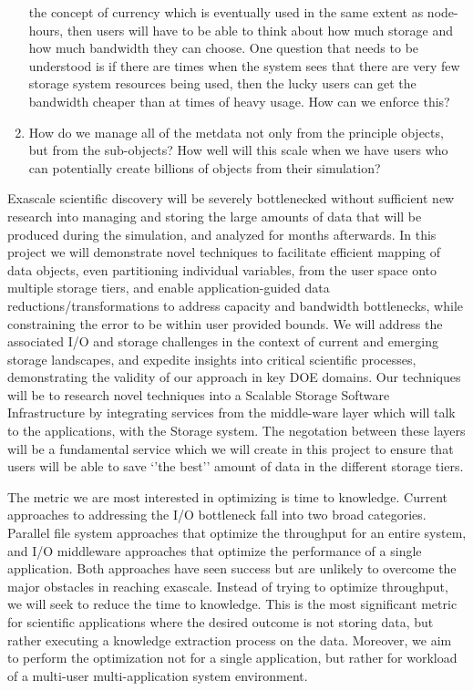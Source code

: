 \begin{enumerate}
the concept of currency which is eventually used in the same extent as node-hours, then users will have to be able to think about how much
storage and how much bandwidth they can choose. One question that needs to be understood is if there are times when the system sees
that there are very few  storage system resources being used, then the lucky users can get the bandwidth cheaper than at times of heavy usage.
How can we enforce this?
\item How do we manage all of the metdata not only from the principle objects, but from the sub-objects? How well will this scale when we have
users who can potentially create billions of objects from their simulation? 

\end{enumerate}

Exascale scientific discovery will be severely bottlenecked without
sufficient new research into managing and storing the large amounts of data
that will be produced during the simulation, and analyzed for months
afterwards.  
%
In this project we will demonstrate novel techniques to
facilitate efficient mapping of data objects, even partitioning individual
variables, from the user space onto multiple storage tiers, and enable
application-guided data reductions/transformations to address capacity and
bandwidth bottlenecks, while constraining the error to be within user
provided bounds. 
%
We will address the associated I/O and storage challenges in the context of
current and emerging storage landscapes, and expedite insights into critical
scientific processes, demonstrating the validity of our approach in key DOE
domains.  Our techniques will be to research novel techniques into a Scalable 
Storage Software Infrastructure by integrating services from the middle-ware layer which will
talk to the applications, with the Storage system. The negotation between these layers will
be a fundamental service which we will create in this project to ensure that users will be able
to save `'the best'' amount of data in the different storage tiers.

The metric we are most interested in optimizing is time to knowledge. Current
approaches to addressing the I/O bottleneck fall into two broad
categories. Parallel file system approaches that optimize the throughput for
an entire system, and I/O middleware approaches that optimize the
performance of a single application. Both approaches have seen success but
are unlikely to overcome the major obstacles in reaching exascale. Instead
of trying to optimize throughput, we will seek to reduce the time to
knowledge. This is the most significant metric for scientific applications
where the desired outcome is not storing data, but rather executing a
knowledge extraction process on the data. Moreover, we aim to perform the
optimization not for a single application, but rather for workload of a
multi-user multi-application system environment.

